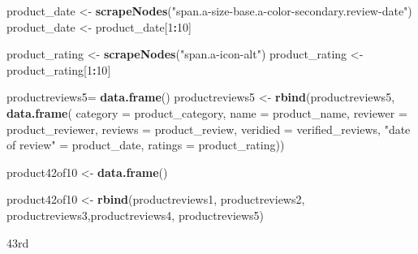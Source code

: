 \documentclass[
]{article}
\newenvironment{Shaded}{\begin{snugshade}}{\end{snugshade}}
\newcommand{\AttributeTok}[1]{\textcolor[rgb]{0.13,0.29,0.53}{#1}}
\newcommand{\DecValTok}[1]{\textcolor[rgb]{0.00,0.00,0.81}{#1}}
\newcommand{\FunctionTok}[1]{\textcolor[rgb]{0.13,0.29,0.53}{\textbf{#1}}}
\newcommand{\NormalTok}[1]{#1}
\newcommand{\OtherTok}[1]{\textcolor[rgb]{0.56,0.35,0.01}{#1}}
\newcommand{\SpecialCharTok}[1]{\textcolor[rgb]{0.81,0.36,0.00}{\textbf{#1}}}
\newcommand{\StringTok}[1]{\textcolor[rgb]{0.31,0.60,0.02}{#1}}
\begin{document}
\begin{Shaded}
\begin{Highlighting}[]
\NormalTok{  product\_date }\OtherTok{\textless{}{-}} \FunctionTok{scrapeNodes}\NormalTok{(}\StringTok{"span.a{-}size{-}base.a{-}color{-}secondary.review{-}date"}\NormalTok{)}
\NormalTok{  product\_date }\OtherTok{\textless{}{-}}\NormalTok{ product\_date[}\DecValTok{1}\SpecialCharTok{:}\DecValTok{10}\NormalTok{]}
  
\NormalTok{  product\_rating }\OtherTok{\textless{}{-}} \FunctionTok{scrapeNodes}\NormalTok{(}\StringTok{"span.a{-}icon{-}alt"}\NormalTok{)}
\NormalTok{  product\_rating }\OtherTok{\textless{}{-}}\NormalTok{ product\_rating[}\DecValTok{1}\SpecialCharTok{:}\DecValTok{10}\NormalTok{]}
  
\NormalTok{  productreviews5}\OtherTok{=} \FunctionTok{data.frame}\NormalTok{()}
\NormalTok{  productreviews5 }\OtherTok{\textless{}{-}} \FunctionTok{rbind}\NormalTok{(productreviews5, }\FunctionTok{data.frame}\NormalTok{(}
                      \AttributeTok{category =}\NormalTok{ product\_category,}
                      \AttributeTok{name =}\NormalTok{ product\_name,}
                      \AttributeTok{reviewer =}\NormalTok{ product\_reviewer,}
                      \AttributeTok{reviews =}\NormalTok{ product\_review,}
                      \AttributeTok{veridied =}\NormalTok{ verified\_reviews,}
                      \StringTok{"date of review"} \OtherTok{=}\NormalTok{ product\_date,}
                      \AttributeTok{ratings =}\NormalTok{ product\_rating))}
  
\NormalTok{  product42of10 }\OtherTok{\textless{}{-}} \FunctionTok{data.frame}\NormalTok{()}
  
\NormalTok{  product42of10 }\OtherTok{\textless{}{-}} \FunctionTok{rbind}\NormalTok{(productreviews1, productreviews2, productreviews3,productreviews4, productreviews5)}
\end{Highlighting}
\end{Shaded}

43rd
\end{document}
